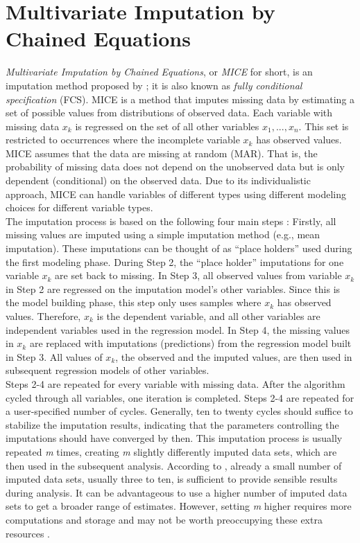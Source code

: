 \section{Multivariate Imputation by Chained Equations}
\textit{Multivariate Imputation by Chained Equations}, or \textit{MICE} for 
short, is an imputation method proposed by \citeauthor{RN135} \cite{RN135}; it 
is also known as \textit{fully conditional specification} (FCS).
MICE is a method that imputes missing data by estimating a set of possible 
values from distributions of observed data. Each variable with missing data 
$x_k$ is regressed on the set of all other variables $x_1,..., x_n$. This set 
is restricted to occurrences where the incomplete variable $x_k$ has 
observed values.
MICE assumes that the data are missing at random (MAR). That is, the 
probability 
of missing data does not depend on the unobserved data but is only 
dependent (conditional) on the observed data. Due to its individualistic 
approach, MICE can handle variables of different types using different 
modeling choices for different variable types.
\\
The imputation process is based on the following four main steps \cite{RN142, 
RN141}: Firstly, all missing values are imputed using a simple imputation 
method (e.g., mean imputation). These imputations can be thought of as ``place 
holders'' used during the first modeling phase. During Step 2, the ``place 
holder'' imputations for one variable $x_k$ are set back to missing. In 
Step 3, all observed values from variable $x_k$ in Step 2 are regressed on 
the imputation model's other variables. Since this is the model building 
phase, this step only uses samples where $x_k$ has observed values. 
Therefore, $x_k$ is the dependent variable, and all other variables are 
independent variables used in the regression model. In Step 4, the missing 
values in $x_k$ are replaced with imputations (predictions) from the 
regression model built in Step 3. All values of $x_k$, the observed and the 
imputed values, are then used in subsequent regression models of other 
variables.
\\
Steps 2-4 are repeated for every variable with missing data. After the 
algorithm cycled through all variables, one iteration is 
completed. Steps 2-4 are repeated for a user-specified number of cycles. 
Generally, ten to twenty cycles should suffice to stabilize the imputation 
results, indicating that the parameters controlling the imputations should have 
converged by then. This imputation process is usually repeated \textit{m} 
times, creating \textit{m} slightly differently imputed data sets, which are 
then used in the subsequent analysis. According to \cite{RN144, RN141, RN142}, 
already a 
small number of imputed data sets, usually three to ten, is sufficient to 
provide sensible results during analysis. It can be advantageous 
to use a higher number of imputed data sets to get a broader range of 
estimates. However, setting \textit{m} higher requires more computations and 
storage 
and may not be worth preoccupying these extra resources \cite{RN144}.

